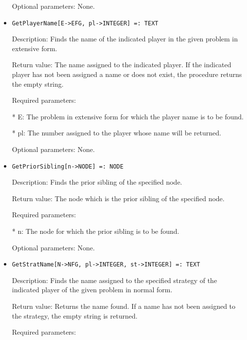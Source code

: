 \begin{itemize}
\item
[Optional parameters:] None.
\ed

\item
\begin{verbatim}
GetPlayerName[E->EFG, pl->INTEGER] =: TEXT
\end{verbatim}

\bd
\item
[Description:] Finds the name of the indicated player in the given 
problem in extensive form.
\item
[Return value:] The name assigned to the indicated player.  If the 
indicated player has not been assigned a name or does not exist, the
procedure returns the empty string.
\item
[Required parameters:]\hfil\null

\bd
\item  
[* E:] The problem in extensive form for which the player name is to
be found.
\item
[* pl:] The number assigned to the player whose name will be 
returned.
\ed

\item
[Optional parameters:] None.
\ed

\item
\begin{verbatim}
GetPriorSibling[n->NODE] =: NODE
\end{verbatim}

\bd
\item
[Description:] Finds the prior sibling of the specified node.
\item
[Return value:] The node which is the prior sibling of the specified node.
\item
[Required parameters:]\hfil\null

\bd
\item
[* n:] The node for which the prior sibling is to be found.
\ed

\item
[Optional parameters:] None.
\ed

\item
\begin{verbatim}
GetStratName[N->NFG, pl->INTEGER, st->INTEGER] =: TEXT
\end{verbatim}

\bd
\item
[Description:] Finds the name assigned to the specified strategy of
the indicated player of the given problem in normal form.
\item
[Return value:] Returns the name found.  If a name has not been assigned
to the strategy, the empty string is returned.
\item
[Required parameters:]\hfil\null


\end{itemize}
